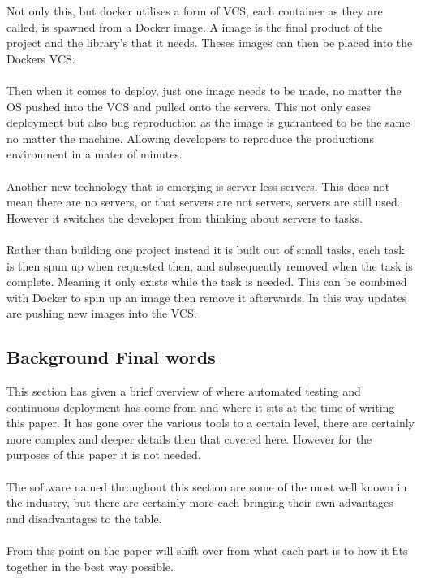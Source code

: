 Not only this, but docker utilises a form of VCS, each container as they are called, is spawned from a Docker image. A image is the final product of the project and the library's that it needs. Theses images can then be placed into the Dockers VCS.
\\\\
Then when it comes to deploy, just one image needs to be made, no matter the OS pushed into the VCS and pulled onto the servers. This not only eases deployment but also bug reproduction as the image is guaranteed to be the same no matter the machine. Allowing developers to reproduce the productions environment in a mater of minutes. 
\\\\
Another new technology that is emerging is server-less servers. This does not mean there are no servers, or that servers are not servers, servers are still used. However it switches the developer from thinking about servers to tasks.
\\\\
Rather than building one project instead it is built out of small tasks, each task is then spun up when requested then, and subsequently removed when the task is complete. Meaning it only exists while the task is needed. This can be combined with Docker to spin up an image then remove it afterwards. In this way updates are pushing new images into the VCS.

\subsection{Background Final words}

This section has given a brief overview of where automated testing and continuous deployment has come from and where it sits at the time of writing this paper. It has gone over the various tools to a certain level, there are certainly more complex and deeper details then that covered here. However for the purposes of this paper it is not needed.
\\\\
The software named throughout this section are some of the most well known in the industry, but there are certainly more each bringing their own advantages and disadvantages to the table.
\\\\
From this point on the paper will shift over from what each part is to how it fits together in the best way possible.